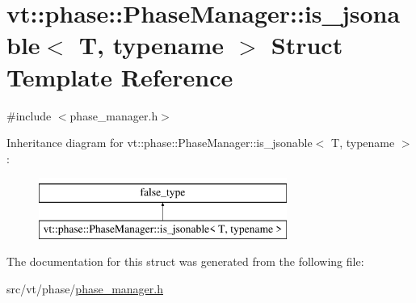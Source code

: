 \hypertarget{structvt_1_1phase_1_1_phase_manager_1_1is__jsonable}{}\section{vt\+:\+:phase\+:\+:Phase\+Manager\+:\+:is\+\_\+jsonable$<$ T, typename $>$ Struct Template Reference}
\label{structvt_1_1phase_1_1_phase_manager_1_1is__jsonable}


{\ttfamily \#include $<$phase\+\_\+manager.\+h$>$}

Inheritance diagram for vt\+:\+:phase\+:\+:Phase\+Manager\+:\+:is\+\_\+jsonable$<$ T, typename $>$\+:\begin{figure}[H]
\begin{center}
\leavevmode
\includegraphics[height=2.000000cm]{structvt_1_1phase_1_1_phase_manager_1_1is__jsonable}
\end{center}
\end{figure}


The documentation for this struct was generated from the following file\+:\begin{DoxyCompactItemize}
\item 
src/vt/phase/\hyperlink{phase__manager_8h}{phase\+\_\+manager.\+h}\end{DoxyCompactItemize}
